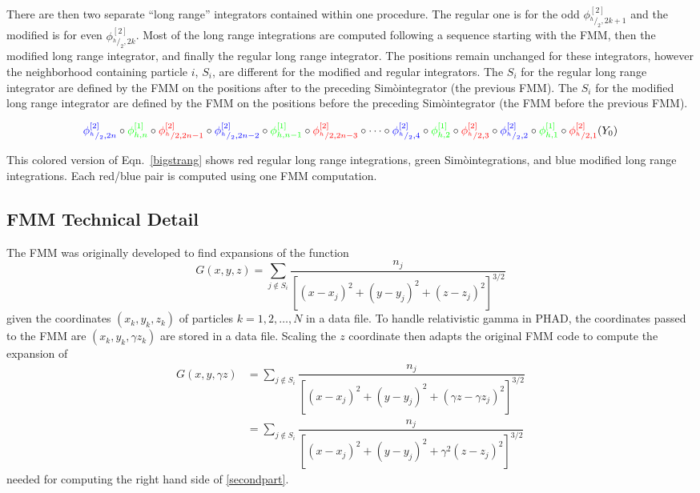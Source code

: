 \documentclass[oneside,12pt]{book}
\newcommand{\Simo}{Sim\`{o}}
\begin{document}
There are then two separate ``long range'' integrators contained within one procedure.  The regular one is for the odd $\phi^{[2]}_{^h\slash_2,2k+1}$ and the modified is for even $\phi^{[2]}_{^h\slash_2,2k}$.  Most of the long range integrations are computed following a sequence starting with the FMM, then the modified long range integrator, and finally the regular long range integrator.  The positions remain unchanged for these integrators, however the neighborhood containing particle $i$, $S_i$, are different for the modified and regular integrators.  The $S_i$ for the regular long range integrator are defined by the FMM on the positions after to the preceding \Simo integrator (the previous FMM).  The $S_i$ for the modified long range integrator are defined by the FMM on the positions before the preceding \Simo integrator (the FMM before the previous FMM).
\begin{footnotesize}
\begin{equation}
{\color{blue}\phi^{[2]}_{^h\slash_2,2n}} \circ 
{\color{green}\phi^{[1]}_{h,n}} \circ 
{\color{red}\phi^{[2]}_{^h \slash 2,2n-1}} \circ 
{\color{blue}\phi^{[2]}_{^h\slash_2,2n-2}} \circ 
{\color{green}\phi^{[1]}_{h,n-1}} \circ 
{\color{red}\phi^{[2]}_{^h \slash 2,2n-3}} \circ \cdots \circ 
{\color{blue}\phi^{[2]}_{^h\slash_2,4}} \circ 
{\color{green}\phi^{[1]}_{h,2}} \circ 
{\color{red}\phi^{[2]}_{^h \slash 2,3}} \circ 
{\color{blue}\phi^{[2]}_{^h\slash_2,2}} \circ 
{\color{green}\phi^{[1]}_{h,1}} \circ 
{\color{red}\phi^{[2]}_{^h \slash 2,1}}(Y_0)
\label{bigstrangcolor}
\end{equation}
\end{footnotesize}
This colored version of Eqn.\ \ref{bigstrang} shows red regular long range integrations, green \Simo integrations, and blue modified long range integrations.  Each red/blue pair is computed using one FMM computation.

\subsection{FMM Technical Detail}
\label{subsec:FMM_Tech_Det}

The FMM was originally developed to find expansions of the function
\[G(x,y,z)=
\displaystyle\sum\limits_{j \notin S_i}
 \dfrac{n_j}{[(x-x_j)^2+(y-y_j)^2+(z-z_j)^2]^{3 \slash 2}}\]
given the coordinates $(x_k,y_k,z_k)$ of particles $k=1,2,\dots,N$ in a data file.  To handle relativistic gamma in PHAD, the coordinates passed to the FMM are $(x_k,y_k,\gamma z_k)$ are stored in a data file.  Scaling the $z$ coordinate then adapts the original FMM code to compute the expansion of
\begin{align*}
G(x,y,\gamma z)&=
\displaystyle\sum\limits_{j \notin S_i}
 \dfrac{n_j}{[(x-x_j)^2+(y-y_j)^2+(\gamma z-\gamma z_j)^2]^{3 \slash 2}}\\
&=\displaystyle\sum\limits_{j \notin S_i}
 \dfrac{n_j}{[(x-x_j)^2+(y-y_j)^2+\gamma^2( z- z_j)^2]^{3 \slash 2}}
\end{align*}
needed for computing the right hand side of \eqref{secondpart}.
\end{document}
